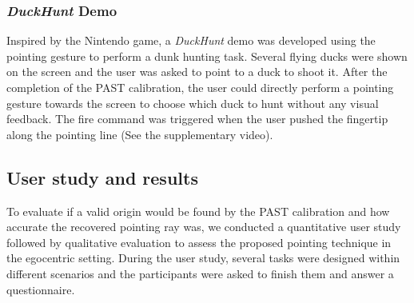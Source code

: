 \subsubsection{\textit{DuckHunt} Demo} \label{sec:4:PointingDemo}
Inspired by the Nintendo game, a \textit{DuckHunt} demo was developed using the pointing gesture to perform a dunk hunting task. Several flying ducks were shown on the screen and the user was asked to point to a duck to shoot it. 
After the completion of the PAST calibration, the user could directly perform a pointing gesture towards the screen to choose which duck to hunt without any visual feedback. The fire command was triggered when the user pushed the fingertip along the pointing line (See the supplementary video).
\subsection{User study and results}
To evaluate if a valid origin would be found by the PAST calibration and how accurate the recovered pointing ray was, we conducted a quantitative user study followed by qualitative evaluation to assess the proposed pointing technique in the egocentric setting. During the user study, several tasks were designed within different scenarios and the participants were asked to finish them and answer a questionnaire.

